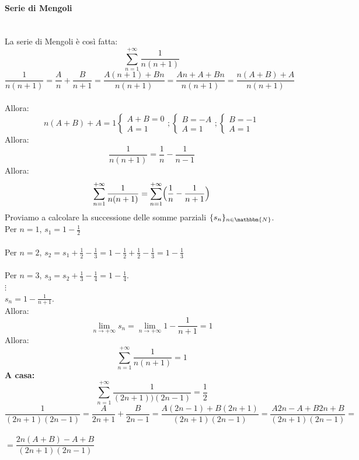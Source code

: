 \documentclass[12pt]{report}
\begin{document}
 		\paragraph{Serie di Mengoli} \quad \\
 		La serie di Mengoli è così fatta:
 		\[
 		\sum_{n=1}^{+\infty}\frac{1}{n(n+1)}
 		\]
 		$\dfrac{1}{n(n+1)} = \dfrac{A}{n} + \dfrac{B}{n+1} = \dfrac{A(n+1) + Bn}{n(n+1)} = \dfrac{An+A+Bn}{n(n+1)} = \dfrac{n(A+B)+A}{n(n+1)}$ \\ \\
 		Allora: \[n(A + B)+A = 1
 		\begin{cases}
 			A+B = 0 \\
 			A = 1
 		\end{cases};\begin{cases}
 		B = -A \\
 		A = 1
 		\end{cases}; \begin{cases}
 		B = -1 \\
 		A = 1
 		\end{cases}\]
 		Allora:
 		\[
 		\frac{1}{n(n+1)} = \frac{1}{n} - \frac{1}{n-1}
 		\]
 		Allora:
 		\[
 		\sum_{n=1}^{+\infty}\frac{1}{n(n+1)} = \sum_{n=1}^{+\infty}\Bigl(\frac{1}{n} - \frac{1}{n+1}\Bigr)
 		\]
 		Proviamo a calcolare la successione delle somme parziali $\{s_n\}_{n\in\mathbbm{N}}$.  \\
 		Per $n=1$, $s_1 = 1 - \frac{1}{2}$ \\ \\
 		Per $n=2$, $s_2 = s_1 + \frac{1}{2} - \frac{1}{3} = 1 - \frac{1}{2} + \frac{1}{2} - \frac{1}{3} = 1 - \frac{1}{3}$ \\ \\
 		Per $n=3$, $s_3=s_2 + \frac{1}{3} - \frac{1}{4} = 1 - \frac{1}{4}$. \\
 		$\vdots$ \\
 		$s_n = 1 - \frac{1}{n+1}$. \\
 		Allora:
 		\[
 		\lim_{n \to +\infty}s_n = \lim_{n \to +\infty}1 - \frac{1}{n+1}=1
 		\]
 		Allora:
 		\[
 		\sum_{n=1}^{+\infty}\frac{1}{n(n+1)}=1
 		\]
 		\textbf{A casa:}
 		\[
 		\sum_{n=1}^{+\infty}\frac{1}{(2n+1))(2n-1)} = \frac{1}{2}
 		\]
 		$\dfrac{1}{(2n+1)(2n-1)} = \dfrac{A}{2n+1} + \dfrac{B}{2n-1} = \dfrac{A(2n-1) + B(2n+1)}{(2n+1)(2n-1)} = \dfrac{A2n - A + B2n + B}{(2n+1)(2n-1)} =$  \\ \\ $ = \dfrac{2n(A + B) - A + B}{(2n+1)(2n-1)}$ \\ \\
\end{document}
